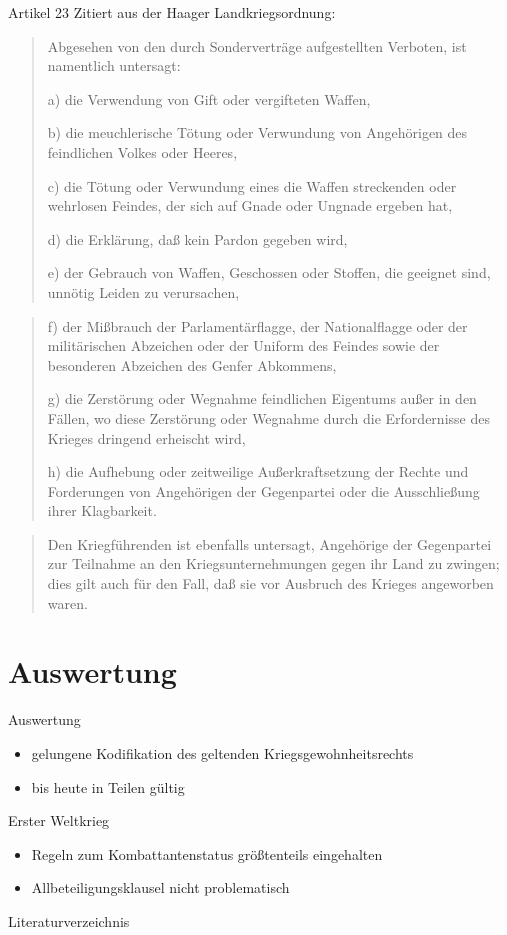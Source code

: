 \documentclass{beamer}
\begin{document}
\begin{frame}[allowframebreaks]{Artikel 23}
    Zitiert aus der Haager Landkriegsordnung\cite{DeutschesReich2010}:
    \begin{quotation}
      Abgesehen von den durch Sonderverträge aufgestellten Verboten, ist namentlich untersagt:

a) die Verwendung von Gift oder vergifteten Waffen,

b) die meuchlerische Tötung oder Verwundung von Angehörigen des feindlichen Volkes oder Heeres,

c) die Tötung oder Verwundung eines die Waffen streckenden oder wehrlosen Feindes, der sich auf Gnade oder Ungnade ergeben hat,

d) die Erklärung, daß kein Pardon gegeben wird,

e) der Gebrauch von Waffen, Geschossen oder Stoffen, die geeignet sind, unnötig Leiden zu verursachen,
    \end{quotation}

    \begin{quotation}
      f) der Mißbrauch der Parlamentärflagge, der Nationalflagge oder der militärischen Abzeichen oder der Uniform des Feindes sowie der besonderen Abzeichen des Genfer Abkommens,

g) die Zerstörung oder Wegnahme feindlichen Eigentums außer in den Fällen, wo diese Zerstörung oder Wegnahme durch die Erfordernisse des Krieges dringend erheischt wird,

h) die Aufhebung oder zeitweilige Außerkraftsetzung der Rechte und Forderungen von Angehörigen der Gegenpartei oder die Ausschließung ihrer Klagbarkeit.
    \end{quotation}

    \begin{quotation}
      Den Kriegführenden ist ebenfalls untersagt, Angehörige der Gegenpartei zur Teilnahme an den Kriegsunternehmungen gegen ihr Land zu zwingen; dies gilt auch für den Fall, daß sie vor Ausbruch des Krieges angeworben waren.
    \end{quotation}
\end{frame}

\section{Auswertung}
\begin{frame}{Auswertung}
    \begin{itemize}
        \item gelungene Kodifikation des geltenden Kriegsgewohnheitsrechts
        \item bis heute in Teilen gültig
    \end{itemize}
\end{frame}
\begin{frame}{Erster Weltkrieg}
    \begin{itemize}
        \item Regeln zum Kombattantenstatus größtenteils eingehalten
        \item Allbeteiligungsklausel nicht problematisch
    \end{itemize}
\end{frame}

\begin{frame}[allowframebreaks]{Literaturverzeichnis}    
    \printbibliography
\end{frame}
\end{document}
